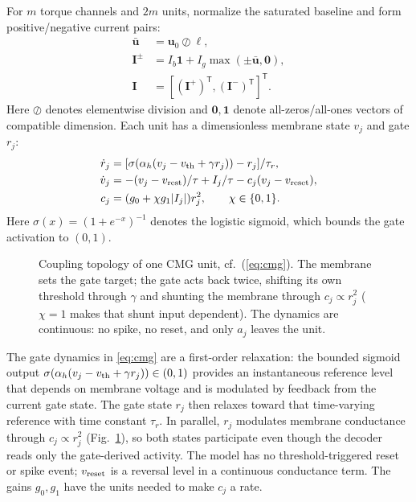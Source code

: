 \documentclass[letterpaper, 10 pt, conference]{ieeeconf}
\newcommand{\T}{^{\mathsf T}}
\begin{document}
For $m$ torque channels and $2m$ units, normalize the saturated baseline and form positive/negative current pairs:
\begin{equation}
 \begin{aligned}
 \bar{\bm u}&=\bm u_0\oslash\bm\ell,\\
 \bm I^{\pm}&=I_b\bm1+I_g\max(\pm\bar{\bm u},\bm0),\\
 \bm I&=[(\bm I^+)\T,(\bm I^-)\T]\T.
 \end{aligned}
 \label{eq:encoding}
\end{equation}
Here $\oslash$ denotes elementwise division and $\bm 0,\bm 1$ denote all-zeros/all-ones vectors of compatible dimension. Each unit has a dimensionless membrane state $v_j$ and gate $r_j$:
\begin{align}
 \dot r_j&=[\sigma(\alpha_h(v_j-v_{\rm th}+\gamma r_j))-r_j]/\tau_r,\\
 \dot v_j&=-(v_j-v_{\rm rest})/\tau+I_j/\tau-c_j(v_j-v_{\rm reset}),\\
 c_j&=(g_0+\chi g_1|I_j|)r_j^2,\qquad \chi\in\{0,1\}.
 \label{eq:cmg}
\end{align}
Here $\sigma(x)=(1+e^{-x})^{-1}$ denotes the logistic sigmoid, which bounds the gate activation to $(0,1)$.

\begin{figure}[t]
\centering
\resizebox{0.86\columnwidth}{!}{}
\caption{Coupling topology of one CMG unit, cf.~(\ref{eq:cmg}). The membrane sets
 the gate target; the gate acts back twice, shifting its own threshold through
 $\gamma$ and shunting the membrane through $c_j\propto r_j^2$ ($\chi=1$ makes
 that shunt input dependent). The dynamics are continuous: no spike, no reset,
 and only $a_j$ leaves the unit.}
\label{fig:cmgunit}
\end{figure}


%
The gate dynamics in \eqref{eq:cmg} are a first-order relaxation: the bounded sigmoid output $\sigma(\alpha_h(v_j-v_{\rm th}+\gamma r_j))\in(0,1)$ provides an instantaneous reference level that depends on membrane voltage and is modulated by feedback from the current gate state. The gate state $r_j$ then relaxes toward that time-varying reference with time constant $\tau_r$. In parallel, $r_j$ modulates membrane conductance through $c_j\propto r_j^2$ (Fig.~\ref{fig:cmgunit}), so both states participate even though the decoder reads only the gate-derived activity. The model has no threshold-triggered reset or spike event; $v_{\rm reset}$ is a reversal level in a continuous conductance term. The gains $g_0,g_1$ have the units needed to make $c_j$ a rate.
\end{document}
